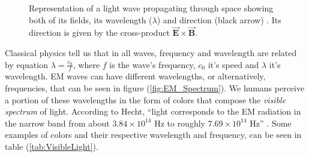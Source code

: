 \begin{figure}[htbp]
    \centering
    \caption{Representation of a light wave propagating through space showing both of its fields, its wavelength ($\lambda$) and direction (black arrow) \cite{Light_EM_Wave_Figure}. Its direction is given by the cross-product $\overrightarrow{\textbf{E}} \times \overrightarrow{\textbf{B}}$.}
    \label{fig:Light_EM_Wave}
\end{figure}


Classical physics tell us that in all waves, frequency and wavelength are related by equation $\lambda = \frac{c_0}{f}$, where $f$ is the wave's frequency, $c_0$ it's speed and $\lambda$ it's wavelength. EM waves can have different wavelengths, or alternatively, frequencies, that can be seen in figure (\ref{fig:EM_Spectrum}). We humans perceive a portion of these wavelengths in the form of colors that compose the \textit{visible spectrum} of light. According to Hecht, ``light corresponds to the EM radiation in the narrow band from about $3.84 \times 10^{14}$ Hz to roughly $7.69 \times 10^{14}$ Hz'' \cite{Hecht_Optics-Visible_Light}. Some examples of colors and their respective wavelength and frequency, can be seen in table (\ref{tab:VisibleLight}).

